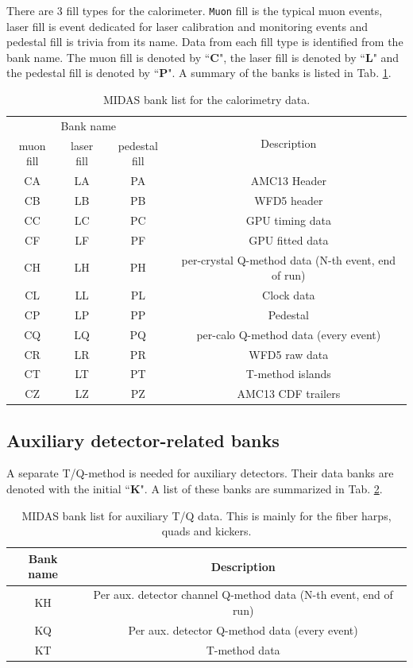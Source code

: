 There are 3 fill types for the calorimeter. \verb+Muon+ fill is the typical muon events, laser fill is event dedicated for laser calibration and monitoring events and pedestal fill is trivia from its name. Data from each fill type is identified from the bank name. The muon fill is denoted by ``\textbf{C}", the laser fill is denoted by ``\textbf{L}" and the pedestal fill is denoted by ``\textbf{P}". A summary of the banks is listed in Tab. \ref{tab:calotable}.

\begin{table}[htbp]
\centering
\caption{MIDAS bank list for the calorimetry data.}
\begin{tabular}{|c|c|c|c|}
\hline 
\multicolumn{3}{|c|}{Bank name}  & \multirow{2}{*}{Description} \\ \cline{1-3}
muon fill& laser fill & pedestal fill & \\
\hline
CA & LA & PA & AMC13 Header \\ 
\hline 
CB & LB & PB & WFD5 header \\ 
\hline 
CC & LC & PC & GPU timing data \\ 
\hline 
CF & LF & PF & GPU fitted data \\ 
\hline 
CH & LH & PH & per-crystal Q-method data (N-th event, end of run) \\ 
\hline 
CL & LL & PL & Clock data \\ 
\hline 
CP & LP & PP & Pedestal\\ 
\hline 
CQ & LQ & PQ & per-calo Q-method data (every event) \\ 
\hline 
CR & LR & PR & WFD5 raw data \\ 
\hline 
CT & LT & PT & T-method islands \\ 
\hline 
CZ & LZ & PZ & AMC13 CDF trailers \\ 
\hline 
\end{tabular} 
\label{tab:calotable}
\end{table}

\subsection{Auxiliary detector-related banks}

A separate T/Q-method is needed for auxiliary detectors. Their data banks are denoted with the initial ``\textbf{K}".
A list of these banks are summarized in Tab. \ref{tab:auxtable}.

\begin{table}[htbp]
\centering
\caption{MIDAS bank list for auxiliary T/Q data. This is mainly for the fiber harps, quads and kickers.}
\begin{tabular}{|c|c|}
\hline 
Bank name  & Description \\
\hline
KH &  Per aux. detector channel Q-method data (N-th event, end of run)\\
\hline
KQ &  Per aux. detector Q-method data (every event)\\
\hline
KT & T-method data \\
\hline
\end{tabular} 
\label{tab:auxtable}
\end{table}

